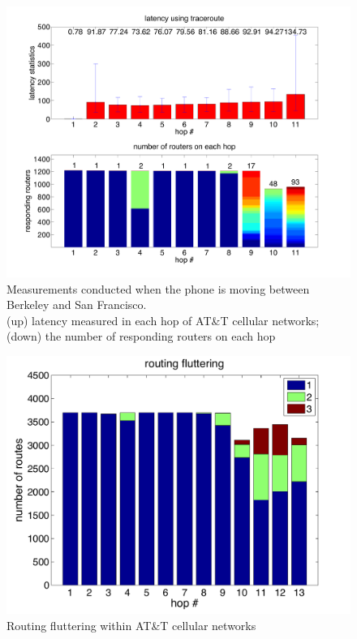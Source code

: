 \begin{figure}
  \centering
  \includegraphics[width=\linewidth]{../figs/mobile_sfo.pdf}
  \vspace{-1em}
  \caption{Measurements conducted when the phone is moving between Berkeley and San Francisco.\\ (up) latency measured in each hop of AT\&T cellular networks; (down) the number of responding routers on each hop}
  \label{fig:mobile_mobile}
\end{figure}

\begin{figure}
  \centering
  \includegraphics[width=\linewidth]{../figs/mobile_fluttering.pdf}
  \vspace{-1em}
  \caption{Routing fluttering within AT\&T cellular networks}
  \label{fig:mobile_fluttering}
\end{figure}

